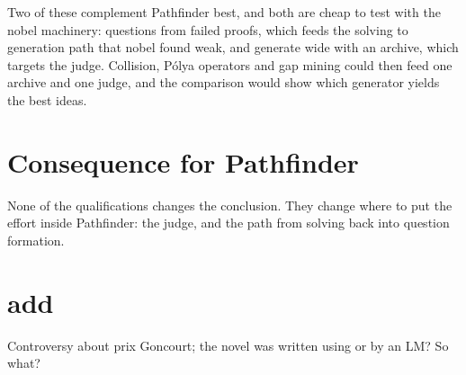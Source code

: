 \documentclass[10pt]{article}
\begin{document}
Two of these complement Pathfinder best, and both are cheap to test with the nobel machinery: questions from
failed proofs, which feeds the solving to generation path that nobel found weak, and generate wide with an archive,
which targets the judge. Collision, P\'olya operators and gap mining could then feed one archive and one judge, and
the comparison would show which generator yields the best ideas.

\section{Consequence for Pathfinder}

None of the qualifications changes the conclusion. They change where to put the effort inside Pathfinder: the
judge, and the path from solving back into question formation.

\section{add}
Controversy about prix Goncourt; the novel was written using or by an LM? So what?
\end{document}
